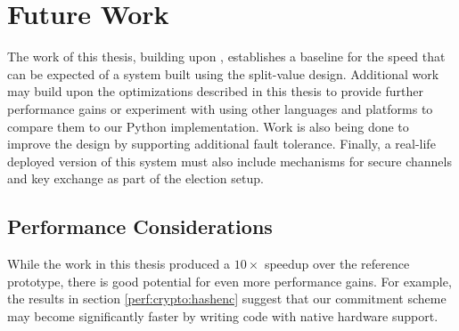 \chapter{Future Work}

The work of this thesis, building upon \cite{marco}, establishes a baseline for the speed that can be expected of a system built using the split-value design. Additional work may build upon the optimizations described in this thesis to provide further performance gains or experiment with using other languages and platforms to compare them to our Python implementation. Work is also being done to improve the design by supporting additional fault tolerance. Finally, a real-life deployed version of this system must also include mechanisms for secure channels and key exchange as part of the election setup.

\section{Performance Considerations}

While the work in this thesis produced a $10 \times$ speedup over the reference prototype, there is good potential for even more performance gains. For example, the results in section \ref{perf:crypto:hashenc} suggest that our commitment scheme may become significantly faster by writing code with native hardware support.

